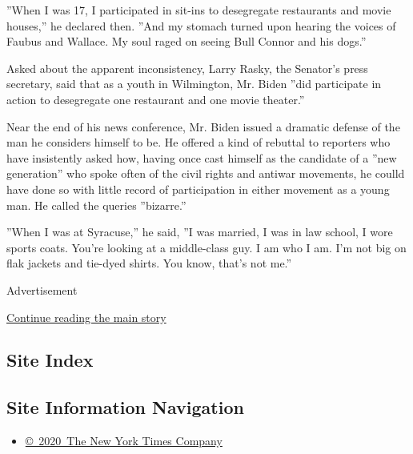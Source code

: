 ''When I was 17, I participated in sit-ins to desegregate restaurants
and movie houses,'' he declared then. ''And my stomach turned upon
hearing the voices of Faubus and Wallace. My soul raged on seeing Bull
Connor and his dogs.''

Asked about the apparent inconsistency, Larry Rasky, the Senator's press
secretary, said that as a youth in Wilmington, Mr. Biden ''did
participate in action to desegregate one restaurant and one movie
theater.''

Near the end of his news conference, Mr. Biden issued a dramatic defense
of the man he considers himself to be. He offered a kind of rebuttal to
reporters who have insistently asked how, having once cast himself as
the candidate of a ''new generation'' who spoke often of the civil
rights and antiwar movements, he coulld have done so with little record
of participation in either movement as a young man. He called the
queries ''bizarre.''

''When I was at Syracuse,'' he said, ''I was married, I was in law
school, I wore sports coats. You're looking at a middle-class guy. I am
who I am. I'm not big on flak jackets and tie-dyed shirts. You know,
that's not me.''

Advertisement

\protect\hyperlink{after-bottom}{Continue reading the main story}

\hypertarget{site-index}{%
\subsection{Site Index}\label{site-index}}

\hypertarget{site-information-navigation}{%
\subsection{Site Information
Navigation}\label{site-information-navigation}}

\begin{itemize}
\tightlist
\item
  \href{https://help.nytimes3xbfgragh.onion/hc/en-us/articles/115014792127-Copyright-notice}{©~2020~The
  New York Times Company}
\end{itemize}

